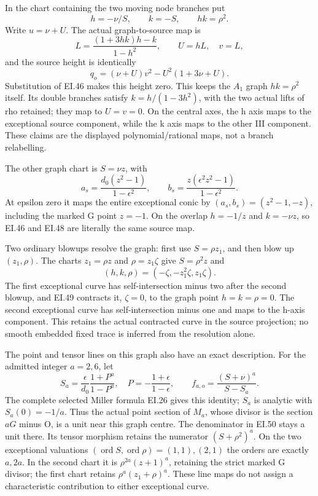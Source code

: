 In the chart containing the two moving node branches put
\[
 h=-\nu/S,\qquad k=-S,
 \qquad hk=\rho^2.
 \tag{EI.45}
\]
Write \(u=\nu+U\). The actual graph-to-source map is
\[
 L=\frac{(1+3hk)h-k}{1-h^2},\qquad
 U=hL,\quad v=L,
 \tag{EI.46}
\]
and the source height is identically
\[
 q_o=(\nu+U)v^2-U^2(1+3\nu+U).
 \tag{EI.47}
\]
Substitution of EI.46 makes this height zero. This keeps the
\(A_1\) graph \(hk=\rho^2\) itself. Its double branches satisfy
\(k=h/(1-3h^2)\), with the two actual lifts of rho retained;
they map to \(U=v=0\). On the central axes, the h axis maps
to the exceptional source component, while the k axis maps to
the other III component. These claims are the displayed
polynomial/rational maps, not a branch relabelling.

The other graph chart is \(S=\nu z\), with
\[
 a_s=\frac{d_0(z^2-1)}{1-\epsilon^2},\qquad
 b_s=\frac{z(\epsilon^2z^2-1)}{1-\epsilon^2}.
 \tag{EI.48}
\]
At epsilon zero it maps the entire exceptional conic by
\((a_s,b_s)=(z^2-1,-z)\), including the marked G point
\(z=-1\). On the overlap \(h=-1/z\) and \(k=-\nu z\),
so EI.46 and EI.48 are literally the same source map.

Two ordinary blowups resolve the graph: first use
\(S=\rho z_1\), and then blow up \((z_1,\rho)\).
The charts \(z_1=\rho z\) and \(\rho=z_1\zeta\)
give \(S=\rho^2z\) and
\[
 (h,k,\rho)=(-\zeta,-z_1^2\zeta,z_1\zeta).
 \tag{EI.49}
\]
The first exceptional curve has self-intersection minus two
after the second blowup, and EI.49 contracts it, \(\zeta=0\),
to the graph point \(h=k=\rho=0\). The second exceptional
curve has self-intersection minus one and maps to the h-axis
component. This retains the actual contracted curve in the
source projection; no smooth embedded fixed trace is inferred
from the resolution alone.

The point and tensor lines on this graph also have an exact
description. For the admitted integer \(a=2,6\), let
\[
 S_a=\frac{\epsilon}{d_0}\frac{1+P^a}{1-P^a},
 \quad P=-\frac{1+\epsilon}{1-\epsilon},\qquad
 f_{a,o}=\frac{(S+\nu)^a}{S-S_a}.
 \tag{EI.50}
\]
The complete selected Miller formula EI.26 gives this identity;
\(S_a\) is analytic with \(S_a(0)=-1/a\). Thus the actual
point section of \(M_a\), whose divisor is the section \(aG\)
minus O, is a unit near this graph centre. The denominator in
EI.50 stays a unit there. Its tensor morphism retains the
numerator \((S+\rho^2)^a\). On the two exceptional valuations
\((\operatorname{ord}S,\operatorname{ord}\rho)=(1,1),(2,1)\)
the orders are exactly \(a,2a\). In the second chart it is
\(\rho^{2a}(z+1)^a\), retaining the strict marked G divisor;
the first chart retains \(\rho^a(z_1+\rho)^a\).
These line maps do not assign a characteristic contribution
to either exceptional curve.

